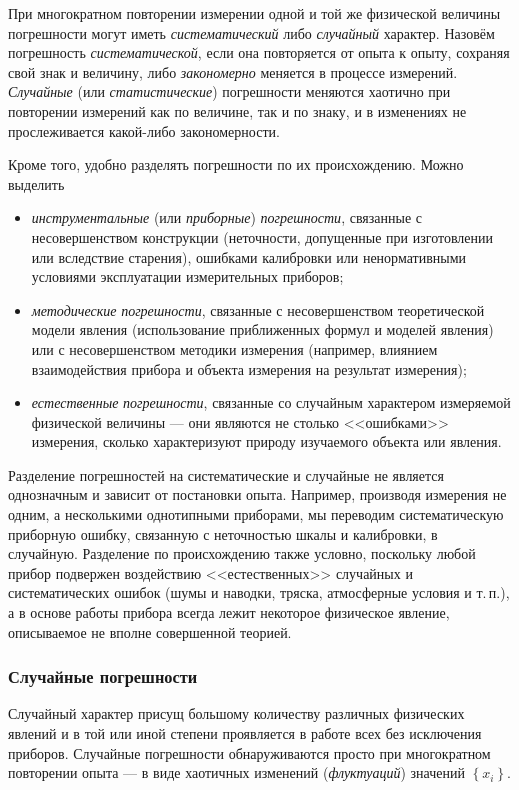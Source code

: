 \documentclass[10pt]{article}
\begin{document}
При многократном повторении измерении одной и той же физической величины
погрешности могут иметь \emph{систематический} либо \emph{случайный}
характер. Назовём погрешность \emph{систематической}, если она повторяется
от опыта к опыту, сохраняя свой знак и величину, либо \emph{закономерно}
меняется в процессе измерений. \emph{Случайные} (или \emph{статистические})
погрешности меняются хаотично при повторении измерений как по величине,
так и по знаку, и в изменениях не прослеживается какой-либо закономерности.

Кроме того, удобно разделять погрешности по их происхождению. Можно
выделить
\begin{itemize}
\item \emph{инструментальные} (или \emph{приборные}) \emph{погрешности},
связанные с несовершенством конструкции (неточности, допущенные при
изготовлении или вследствие старения), ошибками калибровки или ненормативными
условиями эксплуатации измерительных приборов;
\item \emph{методические} \emph{погрешности}, связанные с несовершенством
теоретической модели явления (использование приближенных формул и
моделей явления) или с несовершенством методики измерения (например,
влиянием взаимодействия прибора и объекта измерения на результат измерения);
\item \emph{естественные} \emph{погрешности}, связанные со случайным характером
измеряемой физической величины --- они являются не столько
<<ошибками>> измерения, сколько характеризуют
природу изучаемого объекта или явления.
\end{itemize}
{\footnotesize{}Разделение погрешностей на систематические и случайные
не является однозначным и зависит от постановки опыта. Например, производя
измерения не одним, а несколькими однотипными приборами, мы переводим
систематическую приборную ошибку, связанную с неточностью шкалы и
калибровки, в случайную. Разделение по происхождению также условно,
поскольку любой прибор подвержен воздействию <<естественных>>
случайных и систематических ошибок (шумы и наводки, тряска, атмосферные
условия и т.\,п.), а в основе работы прибора всегда лежит некоторое
физическое явление, описываемое не вполне совершенной теорией.}{\footnotesize\par}

\subsubsection{Случайные погрешности}

Случайный характер присущ большому количеству различных физических
явлений и в той или иной степени проявляется в работе всех без исключения
приборов. Случайные погрешности обнаруживаются просто при многократном
повторении опыта --- в виде хаотичных изменений (\emph{флуктуаций})
значений $\left\{ x_{i}\right\} $.
\end{document}
